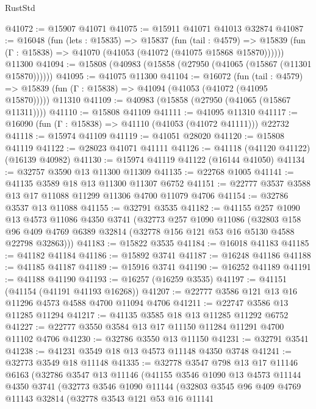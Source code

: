 \begin{lexlean}{RustStd}
\begin{coremodule}
@41072 := @15907 @41071
@41075 := @15911 @41071 @41013 @32874
@41087 := @16048
    (fun (lets : @15835) =>
    @15837
      (fun (tail : @4579) =>
      @15839 (fun (Γ : @15838) => @41070 (@41053 (@41072 (@41075 @15868 @15870))))))
    @11300
@41094 := @15808 (@40983 (@15858 (@27950 (@41065 (@15867 (@11301 @15870))))))
@41095 := @41075 @11300
@41104 := @16072
    (fun (tail : @4579) => @15839 (fun (Γ : @15838) => @41094 (@41053 (@41072 (@41095 @15870)))))
    @11310
@41109 := @40983 (@15858 (@27950 (@41065 (@15867 @11311))))
@41110 := @15808 @41109
@41111 := @41095 @11310
@41117 := @16090 (fun (Γ : @15838) => @41110 (@41053 (@41072 @41111))) @22732
@41118 := @15974 @41109
@41119 := @41051 @28020
@41120 := @15808 @41119
@41122 := @28023 @41071 @41111
@41126 := @41118 (@41120 @41122) (@16139 @40982)
@41130 := @15974 @41119 @41122 (@16144 @41050)
@41134 := @32757 @3590 @13 @11300 @11309
@41135 := @22768 @1005
@41141 := @41135 @3589 @18 @13 @11300 @11307 @6752
@41151 := @22777 @3537 @3588 @13 @17 @11088 @11299 @11306 @4700 @11079 @4706
@41154 := @32786 @3537 @13 @11088
@41155 := @32791 @3535
@41182 := @41155
    @257
    @1090
    @13
    @4573
    @11086
    @4350
    @3741
    (@32773
      @257
      @1090
      @11086
      (@32803
        @158
        @96
        @409
        @4769
        @6389
        @32814
        (@32778 @156 @121 @53 @16 @5130 @4588 @22798 @32863)))
@41183 := @15822 @3535
@41184 := @16018 @41183
@41185 := @41182 @41184
@41186 := @15892 @3741
@41187 := @16248 @41186
@41188 := @41185 @41187
@41189 := @15916 @3741
@41190 := @16252 @41189
@41191 := @41188 @41190
@41193 := @16257 (@16259 @3535)
@41197 := @41151 (@41154 (@41191 @41193 @16268))
@41207 := @22777 @3586 @121 @13 @16 @11296 @4573 @4588 @4700 @11094 @4706
@41211 := @22747 @3586 @13 @11285 @11294
@41217 := @41135 @3585 @18 @13 @11285 @11292 @6752
@41227 := @22777 @3550 @3584 @13 @17 @11150 @11284 @11291 @4700 @11102 @4706
@41230 := @32786 @3550 @13 @11150
@41231 := @32791 @3541
@41238 := @41231 @3549 @18 @13 @4573 @11148 @4350 @3748
@41241 := @32773 @3549 @18 @11148
@41335 := @32778
    @3547
    @798
    @13
    @17
    @11146
    @6163
    (@32786
      @3547
      @13
      @11146
      (@41155
        @3546
        @1090
        @13
        @4573
        @11144
        @4350
        @3741
        (@32773
          @3546
          @1090
          @11144
          (@32803
            @3545
            @96
            @409
            @4769
            @11143
            @32814
            (@32778
              @3543
              @121
              @53
              @16
              @11141

\end{coremodule}
\end{lexlean}
